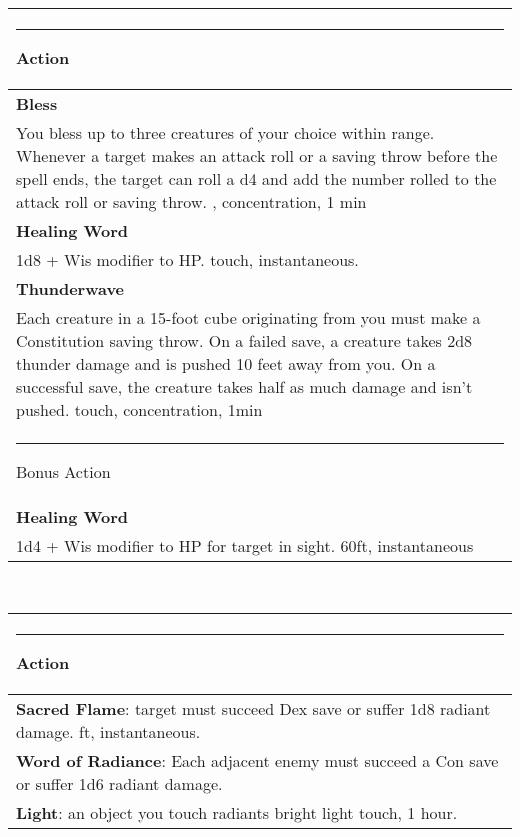 \documentclass[twocolumn]{article}
\begin{document}
\\
\noindent\begin{tabular}{|m{3.1in}|}
\hline
\rule{1.25in}{0pt}Action\\
\hline
\textbf{Bless}\\
You bless up to three creatures of your choice within range. Whenever a target makes an attack roll or a saving throw before the spell ends, the target can roll a d4 and add the number rolled to the attack roll or saving throw.  {\sc 30, concentration, 1 min}\\
\textbf{Healing Word}\\
1d8  + Wis modifier to HP. {\sc touch, instantaneous}.\\
\textbf{Thunderwave}\\
Each creature in a 15-foot cube originating from you must make a Constitution saving throw. On a failed save, a creature takes 2d8 thunder damage and is pushed 10 feet away from you. On a successful save, the creature takes half as much damage and isn't pushed. {\sc touch, concentration, 1min}\\
\hline
\rule{1.1in}{0pt}Bonus Action\\
\hline
\textbf{Healing Word}\\
1d4  + Wis modifier to HP for target in sight. {\sc 60ft, instantaneous}\\
\hline
\end{tabular}
\vspace{8pt}

\\
\noindent\begin{tabular}{|m{3.1in}|}
\hline
\rule{1.25in}{0pt}Action\\
\hline
\textbf{Sacred Flame}: target must succeed Dex save or suffer 1d8 radiant damage. {\sc 60 ft, instantaneous.}\\
\hline
\textbf{Word of Radiance}: Each adjacent enemy must succeed a Con save or suffer 1d6 radiant damage.\\
\hline
\textbf{Light}: an object you touch radiants bright light {\sc touch, 1 hour.}\\
\hline
\end{tabular}
\vspace{8pt}
\end{document}
